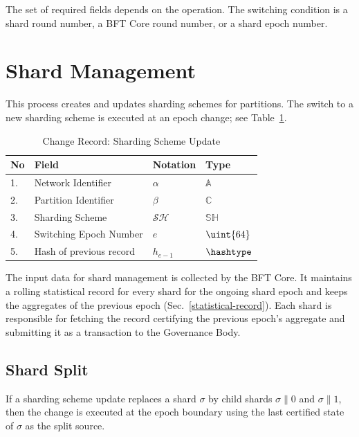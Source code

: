 The set of required fields depends on the operation. The switching condition is a shard round number, a BFT Core round number, or a shard epoch number.

\section{Shard Management}

This process creates and updates sharding schemes for partitions. The switch to a new sharding scheme is executed at an epoch change; see Table~\ref{ta:ssu}.

\begin{table}[!htbp]
	\begin{center}
		\caption{Change Record: Sharding Scheme Update}\label{ta:ssu}
		\begin{tabular}{|p{0.5cm}|p{8cm}|p{1.7cm}|p{3.5cm}|}\hline
			No & Field                      & Notation       & Type          \\\hline\hline
			1. & Network Identifier         & $\alpha$       & $\mathbb{A}$  \\\hline
			2. & Partition Identifier       & $\beta$        & $\mathbb{C}$  \\\hline
			3. & Sharding Scheme            & $\mathcal{SH}$ & $\mathbb{SH}$ \\\hline
			4. & Switching Epoch Number     & $e$            & $\uint{64}$   \\\hline
			5. & Hash of previous record    & $h_{e-1}$      & $\hashtype$  \\\hline
		\end{tabular}
	\end{center}
\end{table}

The input data for shard management is collected by the BFT Core. It maintains a rolling statistical record for every shard for the ongoing shard epoch and keeps the aggregates of the previous epoch (Sec.~\ref{statistical-record}). Each shard is responsible for fetching the record certifying the previous epoch's aggregate and submitting it as a transaction to the Governance Body.

\subsection{Shard Split}

If a sharding scheme update replaces a shard $\sigma$ by child shards $\sigma\|0$ and $\sigma\|1$, then the change is executed at the epoch boundary using the last certified state of $\sigma$ as the split source.

